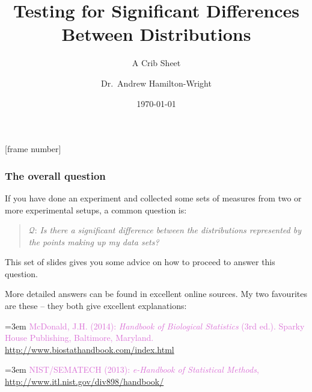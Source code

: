 \documentclass{beamer}
\title{Testing for Significant Differences Between Distributions}
\subtitle{A Crib Sheet}
\author{Dr.~Andrew Hamilton-Wright}
\institute{School of Computer Science\\
University of Guelph}
\date{\today}
\newcommand{\kq}[1]{\textcolor{burntumber}{$\mathcal{Q}$: \emph{#1}}}
\begin{document}
[frame number]


\begin{frame}
    \titlepage
\end{frame}


\begin{frame}
\frametitle{The overall question}
If you have done an experiment and collected some sets of
measures from two or more experimental setups, a common
question is:
\begin{quote}
\kq{Is there a significant difference between the distributions represented by the points making up my data sets?}
\end{quote}

This set of slides gives you some advice on how to proceed to answer
this question.

More detailed answers can be found in excellent online sources.  My
two favourites are these -- they both give excellent explanations:

\hangindent=3em
\textcolor{orchid}{McDonald, J.H. (2014): \emph{Handbook of Biological Statistics} (3rd ed.).
		Sparky House Publishing, Baltimore, Maryland.
		\url{http://www.biostathandbook.com/index.html}}

\hangindent=3em
\textcolor{orchid}{NIST/SEMATECH (2013): \emph{e-Handbook of Statistical Methods}, \url{http://www.itl.nist.gov/div898/handbook/}}
\end{frame}
\end{document}

